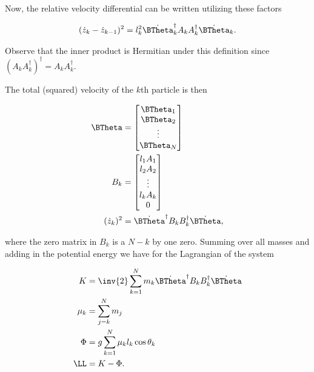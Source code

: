 Now, the relative velocity differential can be written utilizing these factors

\begin{align}\label{eqn:sPolarArxiv:boo3}
(\dot{z}_k - \dot{z}_{k-1})^2 = l_k^2 {\dot{\BTheta}_k}^\dagger A_k A_k^\dagger \dot{\BTheta}_k.
\end{align}

Observe that the inner product is Hermitian under this definition since $(A_k A_k^\dagger)^\dagger = A_k A_k^\dagger$.

The total (squared) velocity of the $k$th particle is then

\begin{align}\label{eqn:sPolarArxiv:boo4}
\BTheta &=
\begin{bmatrix}
\BTheta_1 \\
\BTheta_2 \\
\vdots \\
\BTheta_N \\
\end{bmatrix} \\
B_k &=
\begin{bmatrix}
l_1 A_1 \\
l_2 A_2 \\
\vdots \\
l_k A_k \\
0 \\
\end{bmatrix} \\
(\dot{z}_k)^2 &=
\dot{\BTheta}^\dagger B_k B_k^\dagger \dot{\BTheta},
\end{align}

where the zero matrix in $B_k$ is a $N-k$ by one zero.  Summing over all masses and adding in the potential energy we have for the Lagrangian of the system

\begin{align}\label{eqn:sPolarArxiv:boo5b}
K &=
\inv{2} \sum_{k=1}^N m_k
\dot{\BTheta}^\dagger
B_k B_k^\dagger
\dot{\BTheta} \\
\mu_k &= \sum_{j=k}^N m_j \\
\Phi &=
g \sum_{k=1}^N \mu_k l_k \cos\theta_k \\
\LL &= K - \Phi.
\end{align}

